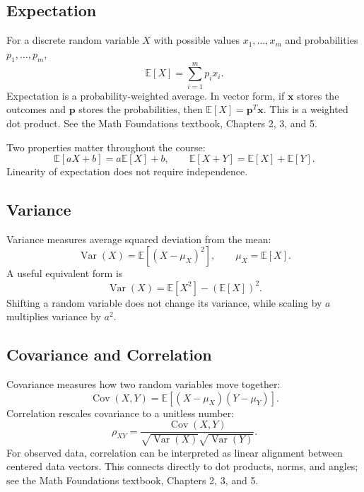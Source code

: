 {\subsection{Expectation}

For a discrete random variable $X$ with possible values $x_1,\ldots,x_m$ and probabilities $p_1,\ldots,p_m$,
\begin{equation}
  \mathbb{E}[X]=\sum_{i=1}^m p_i x_i.
\end{equation}
Expectation is a probability-weighted average.  In vector form, if $\mathbf{x}$ stores the outcomes and $\mathbf{p}$ stores the probabilities, then $\mathbb{E}[X]=\mathbf{p}^T\mathbf{x}$.  This is a weighted dot product.  See the Math Foundations textbook, Chapters 2, 3, and 5.

Two properties matter throughout the course:
\begin{equation}
  \mathbb{E}[aX+b]=a\mathbb{E}[X]+b,
  \qquad
  \mathbb{E}[X+Y]=\mathbb{E}[X]+\mathbb{E}[Y].
\end{equation}
Linearity of expectation does not require independence.

\subsection{Variance}

Variance measures average squared deviation from the mean:
\begin{equation}
  \operatorname{Var}(X)=\mathbb{E}\left[(X-\mu_X)^2\right],
  \qquad \mu_X=\mathbb{E}[X].
\end{equation}
A useful equivalent form is
\begin{equation}
  \operatorname{Var}(X)=\mathbb{E}[X^2]-\left(\mathbb{E}[X]\right)^2.
\end{equation}
Shifting a random variable does not change its variance, while scaling by $a$ multiplies variance by $a^2$.

\subsection{Covariance and Correlation}

Covariance measures how two random variables move together:
\begin{equation}
  \operatorname{Cov}(X,Y)=\mathbb{E}\left[(X-\mu_X)(Y-\mu_Y)\right].
\end{equation}
Correlation rescales covariance to a unitless number:
\begin{equation}
  \rho_{XY}=\frac{\operatorname{Cov}(X,Y)}{\sqrt{\operatorname{Var}(X)}\sqrt{\operatorname{Var}(Y)}}.
\end{equation}
For observed data, correlation can be interpreted as linear alignment between centered data vectors.  This connects directly to dot products, norms, and angles; see the Math Foundations textbook, Chapters 2, 3, and 5.

}
